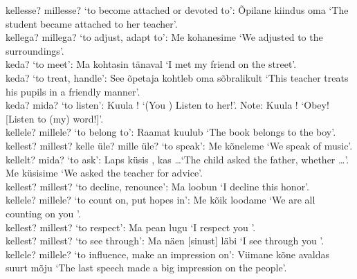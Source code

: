  kellesse? millesse? `to become attached or devoted to': Õpilane kiindus oma  `The student became attached to her teacher'. \\

 kellega? millega? `to adjust, adapt to': Me kohanesime  `We adjusted to the surroundings'. \\

 keda? `to meet': Ma kohtasin  tänaval `I met my friend on the street'. \\

 keda? `to treat, handle': See õpetaja kohtleb oma  sõbralikult `This teacher treats his pupils in a friendly manner'. \\

 keda? mida? `to listen': Kuula ! `(You \sing) Listen to her!'. Note: Kuula ! `Obey! [\lit Listen to (my) word!]'. \\

 kellele? millele? `to belong to': Raamat kuulub  `The book belongs to the boy'. \\

 kellest? millest? kelle üle? mille üle? `to speak': Me kõneleme  `We speak of music'. \\

 kellelt? mida? `to ask': Laps küsis , kas \dots `The child asked the father, whether \dots'. Me küsisime  `We asked the teacher for advice'. \\

 kellest? millest? `to decline, renounce': Ma loobun  `I decline this honor'. \\

 kellele? millele? `to count on, put hopes in': Me kõik loodame  `We are all counting on you \sing'. \\

 kellest? millest? `to respect': Ma pean  lugu `I respect you \sing'. \\

 kellest? millest? `to see through': Ma näen  [sinust] läbi `I see through you '. \\

 kellele? millele? `to influence, make an impression on': Viimane kõne avaldas  suurt mõju `The last speech made a big impression on the people'. \\

